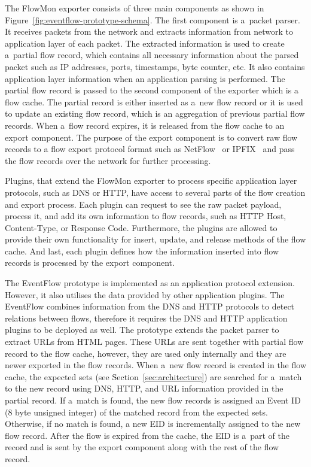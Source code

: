 The FlowMon exporter consists of three main components as shown in Figure~\ref{fig:eventflow-prototype-schema}. The first component is a~packet parser. It receives packets from the network and extracts information from network to application layer of each packet. The extracted information is used to create a~partial flow record, which contains all necessary information about the parsed packet such as IP addresses, ports, timestamps, byte counter, etc. It also contains application layer information when an application parsing is performed. The partial flow record is passed to the second component of the exporter which is a flow cache. The partial record is either inserted as a~new flow record or it is used to update an existing flow record, which is an aggregation of previous partial flow records. When a~flow record expires, it is released from the flow cache to an export component. The purpose of the export component is to convert raw flow records to a flow export protocol format such as NetFlow~\cite{rfc3954} or IPFIX~\cite{rfc7011} and pass the flow records over the network for further processing.

Plugins, that extend the FlowMon exporter to process specific application layer protocols, such as DNS or HTTP, have access to several parts of the flow creation and export process. Each plugin can request to see the raw packet payload, process it, and add its own information to flow records, such as HTTP Host, Content-Type, or Response Code. Furthermore, the plugins are allowed to provide their own functionality for insert, update, and release methods of the flow cache. And last, each plugin defines how the information inserted into flow records is processed by the export component.

The EventFlow prototype is implemented as an application protocol extension. However, it also utilises the data provided by other application plugins. The EventFlow combines information from the DNS and HTTP protocols to detect relations between flows, therefore it requires the DNS and HTTP application plugins to be deployed as well. The prototype extends the packet parser to extract URLs from HTML pages. These URLs are sent together with partial flow record to the flow cache, however, they are used only internally and they are newer exported in the flow records. When a~new flow record is created in the flow cache, the expected sets (see Section~\ref{sec:architecture}) are searched for a~match to the new record using DNS, HTTP, and URL information provided in the partial record. If a~match is found, the new flow records is assigned an Event ID (8 byte unsigned integer) of the matched record from the expected sets. Otherwise, if no match is found, a new EID is incrementally assigned to the new flow record. After the flow is expired from the cache, the EID is a~part of the record and is sent by the export component along with the rest of the flow record.

